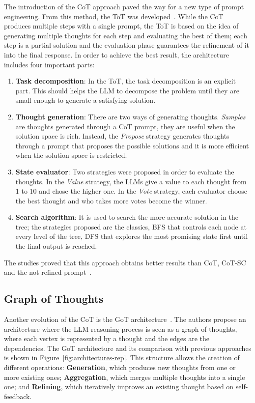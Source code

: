 \documentclass[12pt,a4paper,openright,twoside]{book}
\begin{document}
The introduction of the \ac{CoT} approach paved the way for a new type of prompt engineering. From this method, the \ac{ToT} was developed~\cite{yao2023tot}.
While the \ac{CoT} produces multiple steps with a single prompt, the \ac{ToT} is based on the idea of generating multiple thoughts for each step and evaluating the best of them; each step is a partial solution and the evaluation phase guarantees the refinement of it into the final response. In order to achieve the best result, the architecture includes four important parts:
\begin{enumerate}
    \item \textbf{Task decomposition}: In the \ac{ToT}, the task decomposition is an explicit part. This should helps the \ac{LLM} to decompose the problem until they are small enough to generate a satisfying solution.
    \item \textbf{Thought generation}: There are two ways of generating thoughts. \textit{Samples} are thoughts generated through a \ac{CoT} prompt, they are useful when the solution space is rich. Instead, the \textit{Propose} strategy generates thoughts through a prompt that proposes the possible solutions and it is more efficient when the solution space is restricted.
    \item \textbf{State evaluator}: Two strategies were proposed in order to evaluate the thoughts. In the \textit{Value} strategy, the \acp{LLM} give a value to each thought from 1 to 10 and chose the higher one. In the \textit{Vote} strategy, each evaluator choose the best thought and who takes more votes become the winner.
    \item \textbf{Search algorithm}: It is used to search the more accurate solution in the tree; the strategies proposed are the classics, \ac{BFS} that controls each node at every level of the tree, \ac{DFS} that explores the most promising state first until the final output is reached.
\end{enumerate}

The studies proved that this approach obtains better results than \ac{CoT}, \ac{CoT-SC} and the not refined prompt~\cite{yao2023tot}. 
\subsection{Graph of Thoughts} \label{sec:got}
Another evolution of the \ac{CoT} is the \ac{GoT} architecture~\cite{besta2024got}.
%
The authors propose an architecture where the \ac{LLM} reasoning process is seen as a graph of thoughts, where each vertex is represented by a thought and the edges are the dependencies. 
The \ac{GoT} architecture and its comparison with previous approaches is shown in Figure~\ref{fig:architectures-rep}.
This structure allows the creation of different operations: \textbf{Generation}, which produces new thoughts from one or more existing ones; \textbf{Aggregation}, which merges multiple thoughts into a single one; and \textbf{Refining}, which iteratively improves an existing thought based on self-feedback. 
\end{document}
